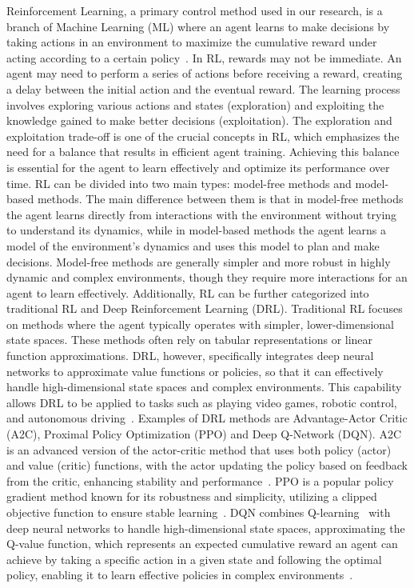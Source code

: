 Reinforcement Learning, a primary control method used in our research, is a branch of Machine Learning (ML) where an agent learns to make decisions by taking actions in an environment to maximize the cumulative reward under acting according to a certain policy~\cite{sutton_reinforcement_2018}. In RL, rewards may not be immediate. An agent may need to perform a series of actions before receiving a reward, creating a delay between the initial action and the eventual reward. The learning process involves exploring various actions and states (exploration) and exploiting the knowledge gained to make better decisions (exploitation). The exploration and exploitation trade-off is one of the crucial concepts in RL, which emphasizes the need for a balance that results in efficient agent training. Achieving this balance is essential for the agent to learn effectively and optimize its performance over time. RL can be divided into two main types: model-free methods and model-based methods. The main difference between them is that in model-free methods the agent learns directly from interactions with the environment without trying to understand its dynamics, while in model-based methods the agent learns a model of the environment's dynamics and uses this model to plan and make decisions. Model-free methods are generally simpler and more robust in highly dynamic and complex environments, though they require more interactions for an agent to learn effectively. 
Additionally, RL can be further categorized into traditional RL and Deep Reinforcement Learning (DRL). Traditional RL focuses on methods where the agent typically operates with simpler, lower-dimensional state spaces. These methods often rely on tabular representations or linear function approximations. DRL, however, specifically integrates deep neural networks to approximate value functions or policies, so that it can effectively handle high-dimensional state spaces and complex environments. This capability allows DRL to be applied to tasks such as playing video games, robotic control, and autonomous driving~\cite{roveda2020mbrl, mnih2013dqn, zhu2022inverted}. Examples of DRL methods are Advantage-Actor Critic (A2C), Proximal Policy Optimization (PPO) and Deep Q-Network (DQN). A2C is an advanced version of the actor-critic method that uses both policy (actor) and value (critic) functions, with the actor updating the policy based on feedback from the critic, enhancing stability and performance~\cite{mnih2016a2c}. PPO is a popular policy gradient method known for its robustness and simplicity, utilizing a clipped objective function to ensure stable learning~\cite{schulman2017ppo}. DQN combines Q-learning~\cite{sutton_reinforcement_2018} with deep neural networks to handle high-dimensional state spaces, approximating the Q-value function, which represents an expected cumulative reward an agent can achieve by taking a specific action in a given state and following the optimal policy, enabling it to learn effective policies in complex environments~\cite{mnih2013dqn}. 
